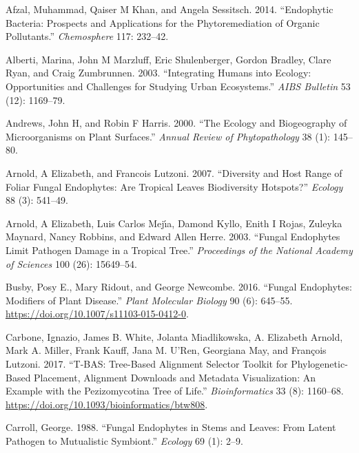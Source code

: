 \documentclass[fleqn,10pt,lineno]{wlpeerj} %
\newlength{\cslhangindent}
\newenvironment{CSLReferences}[2] %
 {%
  \setlength{\parindent}{0pt}
  \ifodd #1 \everypar{\setlength{\hangindent}{\cslhangindent}}\ignorespaces\fi
  \ifnum #2 > 0
  \setlength{\parskip}{#2\baselineskip}
  \fi
 }%
 {}
\begin{document}
\hypertarget{refs}{}
\begin{CSLReferences}{1}{0}
\leavevmode{}%
Afzal, Muhammad, Qaiser M Khan, and Angela Sessitsch. 2014.
{``Endophytic Bacteria: Prospects and Applications for the
Phytoremediation of Organic Pollutants.''} \emph{Chemosphere} 117:
232--42.

\leavevmode{}%
Alberti, Marina, John M Marzluff, Eric Shulenberger, Gordon Bradley,
Clare Ryan, and Craig Zumbrunnen. 2003. {``Integrating Humans into
Ecology: Opportunities and Challenges for Studying Urban Ecosystems.''}
\emph{AIBS Bulletin} 53 (12): 1169--79.

\leavevmode{}%
Andrews, John H, and Robin F Harris. 2000. {``The Ecology and
Biogeography of Microorganisms on Plant Surfaces.''} \emph{Annual Review
of Phytopathology} 38 (1): 145--80.

\leavevmode{}%
Arnold, A Elizabeth, and Francois Lutzoni. 2007. {``Diversity and Host
Range of Foliar Fungal Endophytes: Are Tropical Leaves Biodiversity
Hotspots?''} \emph{Ecology} 88 (3): 541--49.

\leavevmode{}%
Arnold, A Elizabeth, Luis Carlos Mejı́a, Damond Kyllo, Enith I Rojas,
Zuleyka Maynard, Nancy Robbins, and Edward Allen Herre. 2003. {``Fungal
Endophytes Limit Pathogen Damage in a Tropical Tree.''}
\emph{Proceedings of the National Academy of Sciences} 100 (26):
15649--54.

\leavevmode{}%
Busby, Posy E., Mary Ridout, and George Newcombe. 2016. {``Fungal
Endophytes: Modifiers of Plant Disease.''} \emph{Plant Molecular
Biology} 90 (6): 645--55.
\url{https://doi.org/10.1007/s11103-015-0412-0}.

\leavevmode{}%
Carbone, Ignazio, James B. White, Jolanta Miadlikowska, A. Elizabeth
Arnold, Mark A. Miller, Frank Kauff, Jana M. U'Ren, Georgiana May, and
François Lutzoni. 2017. {``T-BAS: Tree-Based Alignment Selector Toolkit
for Phylogenetic-Based Placement, Alignment Downloads and Metadata
Visualization: An Example with the Pezizomycotina Tree of Life.''}
\emph{Bioinformatics} 33 (8): 1160--68.
\url{https://doi.org/10.1093/bioinformatics/btw808}.

\leavevmode{}%
Carroll, George. 1988. {``Fungal Endophytes in Stems and Leaves: From
Latent Pathogen to Mutualistic Symbiont.''} \emph{Ecology} 69 (1): 2--9.


\end{CSLReferences}
\end{document}
